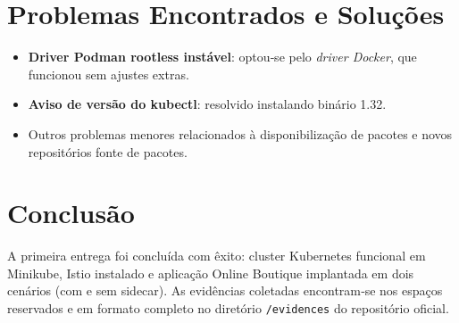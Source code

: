 \documentclass[9pt,a4paper,twocolumn,twoside]{tau-class/tau}
\begin{document}
\section{Problemas Encontrados e Soluções}
\begin{itemize}[leftmargin=*]
  \item \textbf{Driver Podman rootless instável}: optou‑se pelo \emph{driver Docker}, que funcionou sem ajustes extras.
  \item \textbf{Aviso de versão do kubectl}: resolvido instalando binário 1.32.
  \item Outros problemas menores relacionados à disponibilização de pacotes e novos repositórios fonte de pacotes.
\end{itemize}

\section{Conclusão}

A primeira entrega foi concluída com êxito: cluster Kubernetes funcional em
Minikube, Istio instalado e aplicação Online Boutique implantada em dois
cenários (com e sem sidecar). As evidências coletadas encontram‑se nos espaços
reservados e em formato completo no diretório \texttt{/evidences} do
repositório oficial.


\printbibliography

\end{document}
